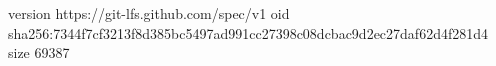 version https://git-lfs.github.com/spec/v1
oid sha256:7344f7cf3213f8d385bc5497ad991cc27398c08dcbac9d2ec27daf62d4f281d4
size 69387
